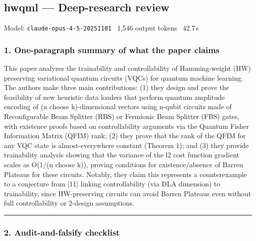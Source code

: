 \documentclass[10pt,letterpaper]{article}
\begin{document}
\subsection{hwqml --- Deep-research review}
\noindent\textcolor{muted}{\small Model: \texttt{claude-opus-4-5-20251101} \textperiodcentered\ 1,546 output tokens \textperiodcentered\ 42.7\,s}

\hypertarget{one-paragraph-summary-of-what-the-paper-claims}{%
\subsubsection{1. One-paragraph summary of what the paper claims}\label{one-paragraph-summary-of-what-the-paper-claims}}

This paper analyzes the trainability and controllability of Hamming-weight (HW) preserving variational quantum circuits (VQCs) for quantum machine learning. The authors make three main contributions: (1) they design and prove the feasibility of new heuristic data loaders that perform quantum amplitude encoding of (n choose k)-dimensional vectors using n-qubit circuits made of Reconfigurable Beam Splitter (RBS) or Fermionic Beam Splitter (FBS) gates, with existence proofs based on controllability arguments via the Quantum Fisher Information Matrix (QFIM) rank; (2) they prove that the rank of the QFIM for any VQC state is almost-everywhere constant (Theorem 1); and (3) they provide trainability analysis showing that the variance of the l2 cost function gradient scales as O(1/(n choose k)), proving conditions for existence/absence of Barren Plateaus for these circuits. Notably, they claim this represents a counterexample to a conjecture from {[}11{]} linking controllability (via DLA dimension) to trainability, since HW-preserving circuits can avoid Barren Plateaus even without full controllability or 2-design assumptions.

\begin{center}\rule{0.5\linewidth}{0.5pt}\end{center}

\hypertarget{audit-and-falsify-checklist}{%
\subsubsection{2. Audit-and-falsify checklist}\label{audit-and-falsify-checklist}}
\end{document}
